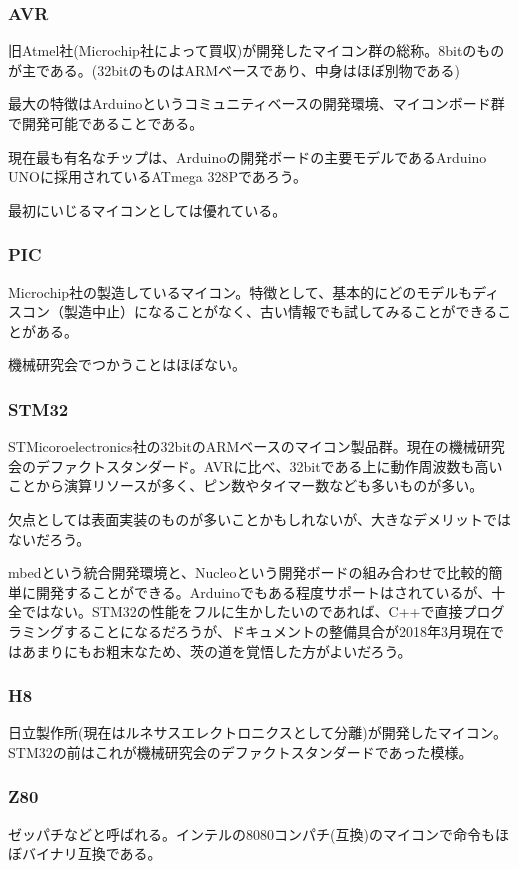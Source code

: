 \documentclass[a4paper,titlepage,here]{ujarticle}
\begin{document}
\subsubsection{AVR}
旧Atmel社(Microchip社によって買収)が開発したマイコン群の総称。8bitのものが主である。(32bitのものはARMベースであり、中身はほぼ別物である)

最大の特徴はArduinoというコミュニティベースの開発環境、マイコンボード群で開発可能であることである。

現在最も有名なチップは、Arduinoの開発ボードの主要モデルであるArduino UNOに採用されているATmega 328Pであろう。

最初にいじるマイコンとしては優れている。
\subsubsection{PIC}
Microchip社の製造しているマイコン。特徴として、基本的にどのモデルもディスコン（製造中止）になることがなく、古い情報でも試してみることができることがある。

機械研究会でつかうことはほぼない。
\subsubsection{STM32}
STMicoroelectronics社の32bitのARMベースのマイコン製品群。現在の機械研究会のデファクトスタンダード。AVRに比べ、32bitである上に動作周波数も高いことから演算リソースが多く、ピン数やタイマー数なども多いものが多い。

欠点としては表面実装のものが多いことかもしれないが、大きなデメリットではないだろう。

mbedという統合開発環境と、Nucleoという開発ボードの組み合わせで比較的簡単に開発することができる。Arduinoでもある程度サポートはされているが、十全ではない。STM32の性能をフルに生かしたいのであれば、C++で直接プログラミングすることになるだろうが、ドキュメントの整備具合が2018年3月現在ではあまりにもお粗末なため、茨の道を覚悟した方がよいだろう。
\subsubsection{H8}
日立製作所(現在はルネサスエレクトロニクスとして分離)が開発したマイコン。STM32の前はこれが機械研究会のデファクトスタンダードであった模様。
\subsubsection{Z80}
ゼッパチなどと呼ばれる。インテルの8080コンパチ(互換)のマイコンで命令もほぼバイナリ互換である。
\end{document}
